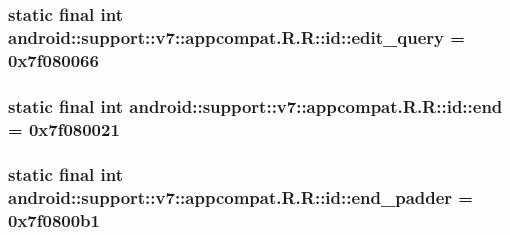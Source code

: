 \hypertarget{classandroid_1_1support_1_1v7_1_1appcompat_1_1_r_1_1id_876039aa6097c7a94fb13f4a4a92ceeb}{
\subsubsection[{edit\_\-query}]{\setlength{\rightskip}{0pt plus 5cm}static final int android::support::v7::appcompat.R.R::id::edit\_\-query = 0x7f080066}}
\label{classandroid_1_1support_1_1v7_1_1appcompat_1_1_r_1_1id_876039aa6097c7a94fb13f4a4a92ceeb}


\hypertarget{classandroid_1_1support_1_1v7_1_1appcompat_1_1_r_1_1id_f05c4d5b5d292828e45256557c6738a7}{
\subsubsection[{end}]{\setlength{\rightskip}{0pt plus 5cm}static final int android::support::v7::appcompat.R.R::id::end = 0x7f080021}}
\label{classandroid_1_1support_1_1v7_1_1appcompat_1_1_r_1_1id_f05c4d5b5d292828e45256557c6738a7}


\hypertarget{classandroid_1_1support_1_1v7_1_1appcompat_1_1_r_1_1id_8058955dfcae623da1da1f4c1b351045}{
\subsubsection[{end\_\-padder}]{\setlength{\rightskip}{0pt plus 5cm}static final int android::support::v7::appcompat.R.R::id::end\_\-padder = 0x7f0800b1}}
\label{classandroid_1_1support_1_1v7_1_1appcompat_1_1_r_1_1id_8058955dfcae623da1da1f4c1b351045}


